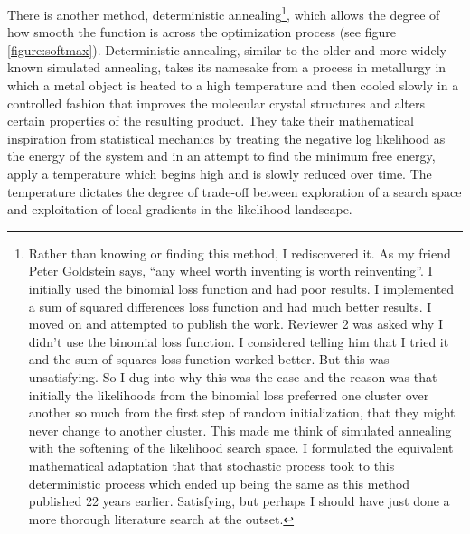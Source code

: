 \par{
There is another method, deterministic annealing\footnote{Rather than knowing or finding this method, I rediscovered it. As my friend Peter Goldstein says, ``any wheel worth inventing is worth reinventing''. I initially used the binomial loss function and had poor results. I implemented a sum of squared differences loss function and had much better results. I moved on and attempted to publish the work. Reviewer 2 was asked why I didn't use the binomial loss function. I considered telling him that I tried it and the sum of squares loss function worked better. But this was unsatisfying. So I dug into why this was the case and the reason was that initially the likelihoods from the binomial loss preferred one cluster over another so much from the first step of random initialization, that they might never change to another cluster. This made me think of simulated annealing with the softening of the likelihood search space. I formulated the equivalent mathematical adaptation that that stochastic process took to this deterministic process which ended up being the same as this method published 22 years earlier. Satisfying, but perhaps I should have just done a more thorough literature search at the outset. }, which allows the degree of how smooth the function is across the optimization process\cite{annealing}\cite{annealing2} (see figure \ref{figure:softmax}). Deterministic annealing, similar to the older and more widely known simulated annealing\cite{simannealing}, takes its namesake from a process in metallurgy in which a metal object is heated to a high temperature and then cooled slowly in a controlled fashion that improves the molecular crystal structures and alters certain properties of the resulting product. They take their mathematical inspiration from statistical mechanics by treating the negative log likelihood as the energy of the system and in an attempt to find the minimum free energy, apply a temperature which begins high and is slowly reduced over time. The temperature dictates the degree of trade-off between exploration of a search space and exploitation of local gradients in the likelihood landscape. }


